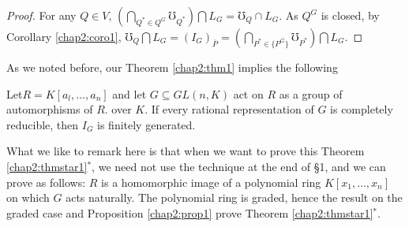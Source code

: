 \begin{proof}
 For any $Q \in V$, $(\underset{Q^{*}\in Q^{G}}{\bigcap} \mho_{Q^{*}})
 \bigcap L_G = \mho_Q \cap L_G$. As $ Q^{G}$ is closed, by Corollary
 \ref{chap2:coro1}, $\mho_Q 
 \bigcap L_G = (I_G)_{\overline{P}} = (\bigcap\limits_{P^{*} \in
   {\{P^{\overline{G}}\}}}\mho _{P^{*}}) \bigcap L_G$.   
\end{proof}

As we noted before, our Theorem \ref{chap2:thm1} implies the following 

\begin{thmstar}\label{chap2:thmstar1}
 Let\pageoriginale  $R = K   [a_l, \ldots, a_n]$  and let $G \subseteq
 GL(n, K)$  act on $R$ as a group of automorphisms of $R$. over $K$.
 If every  rational representation of $G$ is completely
 reducible, then $I_G$  is finitely generated.    
\end{thmstar}

What we like to remark here is that when we want to prove this Theorem
\ref{chap2:thmstar1}{${}^*$}, we need not use the technique at the end
of \S 1, and we can prove as follows: $R$ is a homomorphic image of a
polynomial ring $K[x_1, \ldots , x_n]$ on which $G$ acts
naturally. The polynomial ring is graded, hence the result on the
graded case and Proposition \ref{chap2:prop1} prove Theorem
\ref{chap2:thmstar1}{${}^*$}.     
